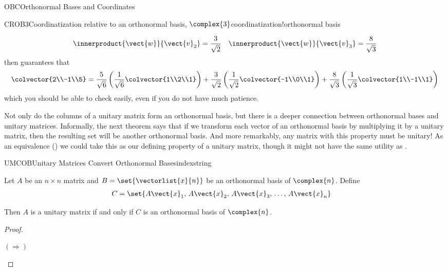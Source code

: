 \begin{subsect}{OBC}{Orthonormal Bases and Coordinates}
\begin{example}{CROB3}{Coordinatization relative to an orthonormal basis, $\complex{3}$}{coordinatization!orthonormal basis}
\begin{para}
\begin{align*}
\innerproduct{\vect{w}}{\vect{v}_2}=\frac{3}{\sqrt{2}}&&
\innerproduct{\vect{w}}{\vect{v}_3}=\frac{8}{\sqrt{3}}
\end{align*}
%
then  guarantees that
%
\begin{equation*}
\colvector{2\\-1\\5}=
\frac{5}{\sqrt{6}}\left(\frac{1}{\sqrt{6}}\colvector{1\\2\\1}\right)+
\frac{3}{\sqrt{2}}\left(\frac{1}{\sqrt{2}}\colvector{-1\\0\\1}\right)+
\frac{8}{\sqrt{3}}\left(\frac{1}{\sqrt{3}}\colvector{1\\-1\\1}\right)
\end{equation*}
%
which you should be able to check easily, even if you do not have much patience.\end{para}
%
\end{example}
%
\begin{para}Not only do the columns of a unitary matrix form an orthonormal basis, but there is a deeper connection between orthonormal bases and unitary matrices.  Informally, the next theorem says that if we transform each vector of an orthonormal basis by multiplying it by a unitary matrix, then the resulting set will be another orthonormal basis.  And more remarkably, any matrix with this property must be unitary!  As an equivalence () we could take this as our defining property of a unitary matrix, though it might not have the same utility as .\end{para}
%
\begin{theorem}{UMCOB}{Unitary Matrices Convert Orthonormal Bases}{indexstring}
\begin{para}Let $A$ be an $n\times n$ matrix and $B=\set{\vectorlist{x}{n}}$ be an orthonormal basis of $\complex{n}$.  Define
%
\begin{align*}
C&=\set{A\vect{x}_1,\,A\vect{x}_2,\,A\vect{x}_3,\,\dots,\,A\vect{x}_n}
\end{align*}\end{para}
%
\begin{para}Then $A$ is a unitary matrix if and only if $C$ is an orthonormal basis of $\complex{n}$.\end{para}
\end{theorem}
%
\begin{proof}
%
\begin{para}$\left(\Rightarrow\right)$\quad

\end{para}
\end{proof}
\end{subsect}

